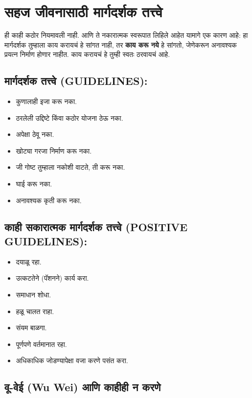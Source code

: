 \chapter{सहज जीवनासाठी मार्गदर्शक तत्त्वे}

ही काही कठोर नियमावली नाही.  
आणि ते नकारात्मक स्वरूपात लिहिले आहेत यामागे एक कारण आहे:  
हा मार्गदर्शक तुम्हाला काय करायचं हे सांगत नाही, तर \textbf{काय करू नये} हे सांगतो, जेणेकरून अनावश्यक प्रयत्न निर्माण होणार नाहीत.  
काय करायचं हे तुम्ही स्वतः ठरवायचं आहे.  


\section*{मार्गदर्शक तत्त्वे (GUIDELINES):}

\begin{itemize}
  \item कुणालाही इजा करू नका.  
  \item ठरलेली उद्दिष्टे किंवा कठोर योजना ठेऊ नका.  
  \item अपेक्षा ठेवू नका.  
  \item खोट्या गरजा निर्माण करू नका.  
  \item जी गोष्ट तुम्हाला नकोशी वाटते, ती करू नका.  
  \item घाई करू नका.  
  \item अनावश्यक कृती करू नका.  
\end{itemize}



\section*{काही सकारात्मक मार्गदर्शक तत्त्वे (POSITIVE GUIDELINES):}

\begin{itemize}
  \item दयाळू रहा.  
  \item उत्कटतेने (पॅशनने) कार्य करा.  
  \item समाधान शोधा.  
  \item हळू चालत राहा.  
  \item संयम बाळगा.  
  \item पूर्णपणे वर्तमानात रहा.  
  \item अधिकाधिक जोडण्यापेक्षा वजा करणे पसंत करा.  
\end{itemize}

\section{वू-वेई (Wu Wei) आणि काहीही न करणे}

